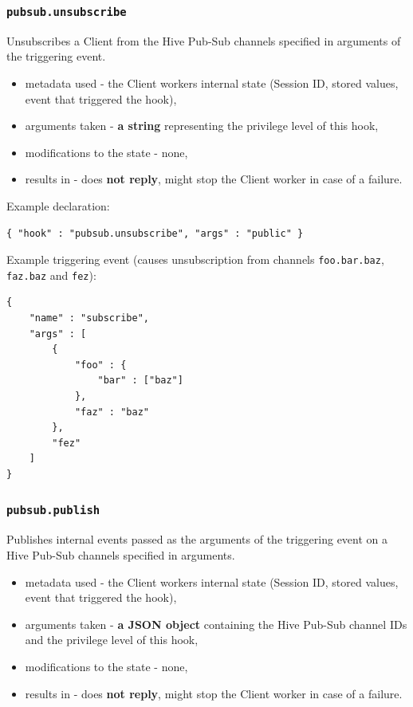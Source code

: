 \documentclass[a4paper]{article}
\begin{document}
\subsubsection{\texttt{pubsub.unsubscribe}}
\label{sec-9-2-5}


Unsubscribes a Client from the Hive Pub-Sub channels specified in arguments of the triggering event.


\begin{itemize}
\item metadata used - the Client workers internal state (Session ID, stored values, event that triggered the hook),
\item arguments taken - \textbf{a string} representing the privilege level of this hook,
\item modifications to the state - none,
\item results in - does \textbf{not reply}, might stop the Client worker in case of a failure.
\end{itemize}

\noindent
Example declaration:

\begin{verbatim}
{ "hook" : "pubsub.unsubscribe", "args" : "public" }
\end{verbatim}




\noindent
Example triggering event (causes unsubscription from channels \texttt{foo.bar.baz}, \texttt{faz.baz} and \texttt{fez}):


\begin{verbatim}
{
    "name" : "subscribe",
    "args" : [
        {
            "foo" : {
                "bar" : ["baz"]
            },
            "faz" : "baz"
        },
        "fez"
    ]
}
\end{verbatim}
\subsubsection{\texttt{pubsub.publish}}
\label{sec-9-2-6}


Publishes internal events passed as the arguments of the triggering event on a Hive Pub-Sub channels specified in arguments.


\begin{itemize}
\item metadata used - the Client workers internal state (Session ID, stored values, event that triggered the hook),
\item arguments taken - \textbf{a JSON object} containing the Hive Pub-Sub channel IDs and the privilege level of this hook,
\item modifications to the state - none,
\item results in - does \textbf{not reply}, might stop the Client worker in case of a failure.
\end{itemize}
\end{document}
